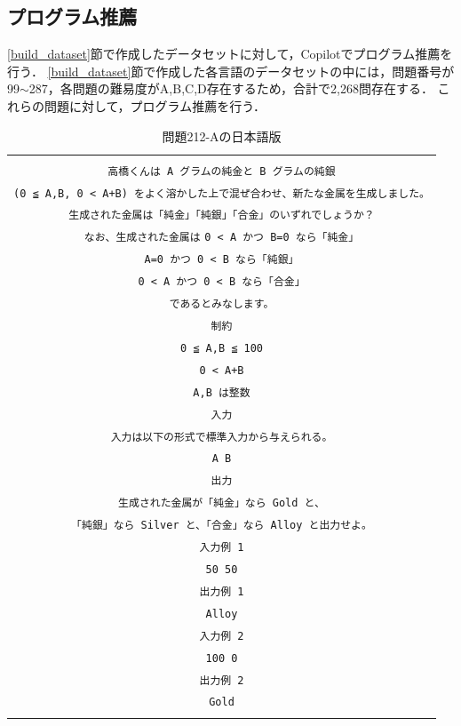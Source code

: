   \subsection{プログラム推薦\label{recommend_program}}
    \ref{build_dataset}節で作成したデータセットに対して，Copilotでプログラム推薦を行う．
    \ref{build_dataset}節で作成した各言語のデータセットの中には，問題番号が99${\sim}$287，各問題の難易度がA,B,C,D存在するため，合計で2,268問存在する．
    これらの問題に対して，プログラム推薦を行う．
    
    \begin{table}[t]
      \caption{問題212-Aの日本語版}
      \begin{tabular}{c}
        \begin{tabularx}{23zw}{X}
          \hline
          \verb|問題文| \\
          \verb|高橋くんは A グラムの純金と B グラムの純銀| \\
          \verb|(0 ≦ A,B, 0 < A+B) をよく溶かした上で混ぜ合わせ、新たな金属を生成しました。| \\
          \verb|生成された金属は「純金」「純銀」「合金」のいずれでしょうか？| \\
          \verb|なお、生成された金属は|
          \verb|0 < A かつ B=0 なら「純金」| \\
          \verb|A=0 かつ 0 < B なら「純銀」| \\
          \verb|0 < A かつ 0 < B なら「合金」| \\
          \verb|であるとみなします。| \\
          \verb|制約| \\
          \verb|0 ≦ A,B ≦ 100| \\
          \verb|0 < A+B| \\
          \verb|A,B は整数| \\
          \verb|入力| \\
          \verb|入力は以下の形式で標準入力から与えられる。| \\
          \verb|A B| \\
          \verb|出力| \\
          \verb|生成された金属が「純金」なら Gold と、| \\
          \verb|「純銀」なら Silver と、「合金」なら Alloy と出力せよ。| \\
          \verb|入力例 1| \\
          \verb|50 50| \\
          \verb|出力例 1| \\
          \verb|Alloy| \\
          \verb|入力例 2| \\
          \verb|100 0| \\
          \verb|出力例 2| \\
          \verb|Gold| \\
          \hline
        \end{tabularx}
      \end{tabular}
      \label{problem_212_A_en}
    \end{table}

